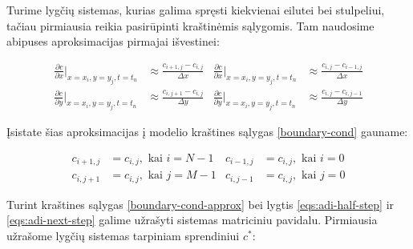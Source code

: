 Turime lygčių sistemas, kurias galima spręsti kiekvienai eilutei bei stulpeliui, tačiau pirmiausia reikia pasirūpinti kraštinėmis sąlygomis. Tam naudosime abipuses aproksimacijas pirmajai išvestinei:

\begin{align*}
  \frac{\partial c}{\partial x}\Big|_{x=x_i, y=y_j, t=t_n} &\approx \frac{c_{i+1,j}-c_{i,j}}{\Delta x} &
  \frac{\partial c}{\partial x}\Big|_{x=x_i, y=y_j, t=t_n} &\approx \frac{c_{i,j}-c_{i-1,j}}{\Delta x}\\
  \frac{\partial c}{\partial y}\Big|_{x=x_i, y=y_j, t=t_n} &\approx \frac{c_{i,j+1}-c_{i,j}}{\Delta y} &
  \frac{\partial c}{\partial y}\Big|_{x=x_i, y=y_j, t=t_n} &\approx \frac{c_{i,j}-c_{i,j-1}}{\Delta y}
\end{align*}

Įsistate šias aproksimacijas į modelio kraštines sąlygas \eqref{boundary-cond} gauname:

\begin{align} \label{boundary-cond-approx}
  c_{i+1,j} &= c_{i,j}, \text{ kai } i = N - 1 &
  c_{i-1,j} &= c_{i,j}, \text{ kai } i = 0\\
  c_{i,j+1} &= c_{i,j}, \text{ kai } j = M - 1 &
  c_{i,j-1} &= c_{i,j}, \text{ kai } j = 0
\end{align}

Turint kraštines sąlygas \eqref{boundary-cond-approx} bei lygtis \eqref{eqs:adi-half-step} ir \eqref{eqs:adi-next-step} galime užrašyti sistemas matriciniu pavidalu. Pirmiausia užrašome lygčių sistemas tarpiniam sprendiniui $c^*$:

